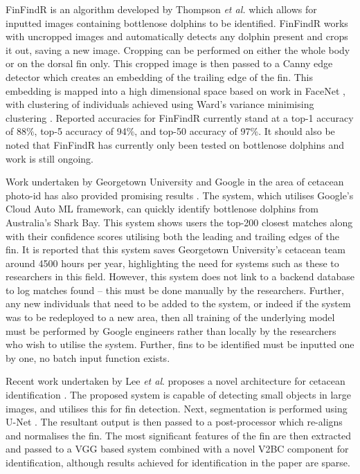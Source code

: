 FinFindR is an algorithm developed by Thompson \textit{et al.} \cite{thompson_finfindr_2022} which allows for inputted images containing bottlenose dolphins to be identified. FinFindR works with uncropped images and automatically detects any dolphin present and crops it out, saving a new image. Cropping can be performed on either the whole body or on the dorsal fin only. This cropped image is then passed to a Canny edge detector which creates an embedding of the trailing edge of the fin. This embedding is mapped into a high dimensional space based on work in FaceNet \cite{schroff_facenet_2015}, with clustering of individuals achieved using Ward's variance minimising clustering \cite{ward_hierarchical_1963}. Reported accuracies for FinFindR currently stand at a top-1 accuracy of 88\%, top-5 accuracy of 94\%, and top-50 accuracy of 97\%. It should also be noted that FinFindR has currently only been tested on bottlenose dolphins and work is still ongoing.

Work undertaken by Georgetown University and Google in the area of cetacean photo-id has also provided promising results \cite{georgetown_university_is_2018}. The system, which utilises Google's Cloud Auto ML framework, can quickly identify bottlenose dolphins from Australia's Shark Bay. This system shows users the top-200 closest matches along with their confidence scores utilising both the leading and trailing edges of the fin. It is reported that this system saves Georgetown University's cetacean team around 4500 hours per year, highlighting the need for systems such as these to researchers in this field. However, this system does not link to a backend database to log matches found -- this must be done manually by the researchers. Further, any new individuals that need to be added to the system, or indeed if the system was to be redeployed to a new area, then all training of the underlying model must be performed by Google engineers rather than locally by the researchers who wish to utilise the system. Further, fins to be identified must be inputted one by one, no batch input function exists.  

Recent work undertaken by Lee \textit{et al}. proposes a novel architecture for cetacean identification \cite{lee_backbone_2020}. The proposed system is capable of detecting small objects in large images, and utilises this for fin detection. Next, segmentation is performed using U-Net \cite{ronneberger_u-net_2015}. The resultant output is then passed to a post-processor which re-aligns and normalises the fin. The most significant features of the fin are then extracted and passed to a VGG based system \cite{simonyan_very_2015} combined with a novel V2BC component for identification, although results achieved for identification in the paper are sparse.

